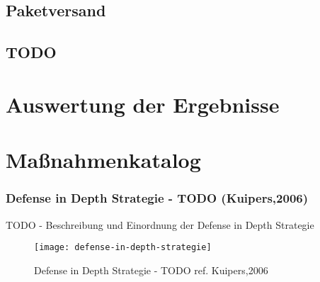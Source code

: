 \subsection{Paketversand}
\subsection{TODO}

\section{Auswertung der Ergebnisse}

\section{Maßnahmenkatalog}
\subsubsection{Defense in Depth Strategie - TODO (Kuipers,2006)}

TODO - Beschreibung und Einordnung der Defense in Depth Strategie

\begin{figure}[h]
    \centering
    \texttt{[image: defense-in-depth-strategie]}
    \caption{Defense in Depth Strategie - TODO ref. Kuipers,2006}
    \label{Kap3:Defense-in-Depth}
\end{figure}

